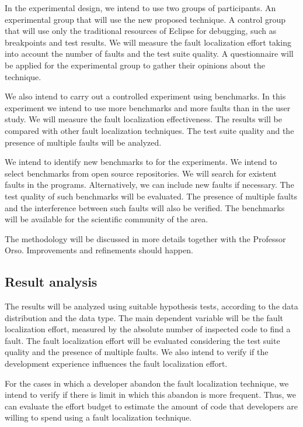 \documentclass[12pt,a4paper,espaco=umemeio,noindentfirst,oneside,openany,tocpage=plain,pnumromarab,ruledheader,time,anapcustomindent]{sty/abnt}
\begin{document}
In the experimental design, we intend to use two groups of participants. An experimental group that will use the new proposed 
technique. A control group that will use only the traditional resources of Eclipse for debugging, such as breakpoints and 
test results. We will measure the fault localization effort taking into account the number of faults and the test suite quality. 
A questionnaire will be applied for the experimental group to gather their opinions about the technique.

We also intend to carry out a controlled experiment using benchmarks. In this experiment we intend to use more benchmarks and 
more faults than in the user study. We will measure the fault localization effectiveness. The results will be compared with 
other fault localization techniques. The test suite quality and the presence of multiple faults will be analyzed.

We intend to identify new benchmarks to for the experiments. We intend to select benchmarks from open source repositories. 
We will search for existent faults in the programs. Alternatively, we can include new faults if necessary.
The test quality of such benchmarks will be evaluated. The presence of multiple faults and the interference between such 
faults will also be verified. The benchmarks will be available for the scientific community of the area.

The methodology will be discussed in more details together with the Professor Orso. Improvements and refinements 
should happen.


\subsection{Result analysis}
\label{analysis}

The results will be analyzed using suitable hypothesis tests, according to the data distribution and the data type.
The main dependent variable will be the fault localization effort, measured by the absolute number of inspected code to 
find a fault. The fault localization effort will be evaluated considering the test suite quality and the presence of multiple faults. 
We also intend to verify if the development experience influences the fault localization effort.

For the cases in which a developer abandon the fault localization technique, we intend to verify if there is limit in which this abandon 
is more frequent. Thus, we can evaluate the effort budget to estimate the amount of code that developers are willing to spend using a 
fault localization technique.
\end{document}
